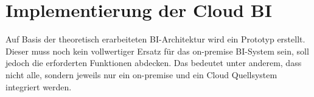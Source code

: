 \chapter{Implementierung der Cloud BI} \label{ch:praktischeUmsetzung}
Auf Basis der theoretisch erarbeiteten BI-Architektur wird ein Prototyp erstellt. Dieser muss noch kein vollwertiger Ersatz für das on-premise BI-System sein, soll jedoch die erforderten Funktionen abdecken. Das bedeutet unter anderem, dass nicht alle, sondern jeweils nur ein on-premise und ein Cloud Quellsystem integriert werden.





